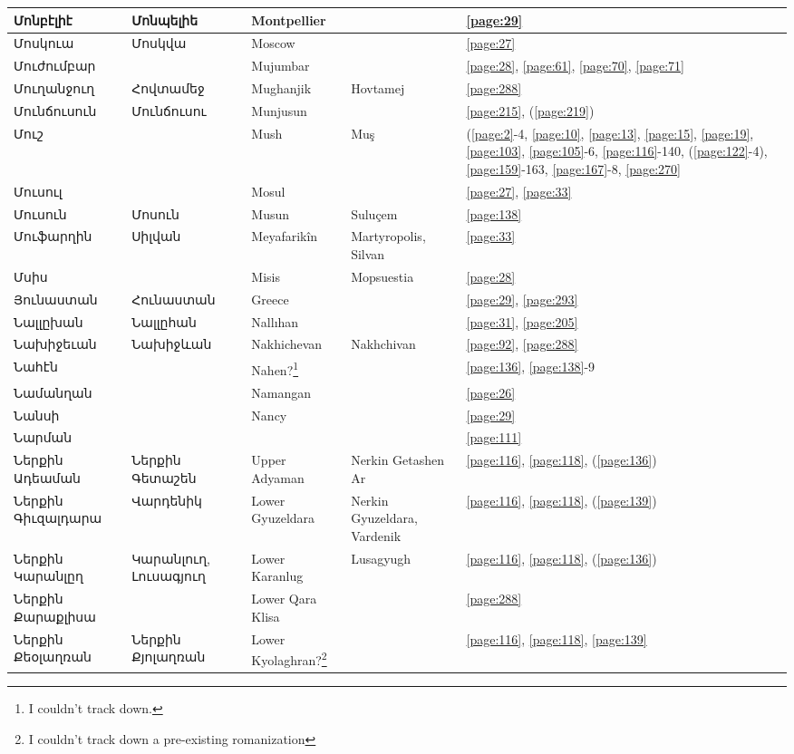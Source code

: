 \begin{center}
\begin{longtable}{|p{}|p{3cm}|p{3cm}|p{2cm}|p{3cm}|}
Մոնբէլիէ&Մոնպելիե & Montpellier& &\ref{page:29}\\ \hline
Մոսկուա& Մոսկվա&Moscow & &\ref{page:27}\\ \hline
Մուժումբար& & Mujumbar& &\ref{page:28}, \ref{page:61}, \ref{page:70}, \ref{page:71}\\ \hline
Մուղանջուղ& Հովտամեջ &  Mughanjik &Hovtamej &\ref{page:288}\\ \hline
Մունճուսուն&Մունճուսու&Munjusun & &\ref{page:215}, (\ref{page:219})\\ \hline
Մուշ& & 
Mush&Muş &(\ref{page:2}-4, \ref{page:10}, \ref{page:13}, \ref{page:15}, \ref{page:19}, \ref{page:103}, \ref{page:105}-6, \ref{page:116}-140, (\ref{page:122}-4), \ref{page:159}-163, \ref{page:167}-8, \ref{page:270}\\ \hline
Մուսուլ& &Mosul & &\ref{page:27}, \ref{page:33}\\ \hline
Մուսուն& Մոսուն & Musun &Suluçem &\ref{page:138}\\ \hline
Մուֆարղին&Սիլվան &Meyafarikîn &Martyropolis, Silvan &\ref{page:33}\\ \hline
Մսիս& & Misis& Mopsuestia&\ref{page:28}\\ \hline
Յունաստան&Հունաստան & Greece& &\ref{page:29}, \ref{page:293}\\ \hline
Նալլըխան& Նալլըհան &Nallıhan & &\ref{page:31}, \ref{page:205}\\ \hline
Նախիջեւան&Նախիջևան &
Nakhichevan& Nakhchivan&\ref{page:92}, \ref{page:288}\\ \hline
Նահէն& &Nahen?\footnote{I couldn't track down.} & &\ref{page:136}, \ref{page:138}-9\\ \hline
Նամանղան& & Namangan& &\ref{page:26}\\ \hline
Նանսի& & Nancy& &\ref{page:29}\\ \hline
Նարման& & & &\ref{page:111}\\ \hline
Ներքին Ադեաման& Ներքին Գետաշեն& Upper Adyaman&  Nerkin Getashen Ar&\ref{page:116}, \ref{page:118}, (\ref{page:136})\\ \hline
Ներքին Գիւզալդարա& Վարդենիկ &Lower Gyuzeldara & Nerkin Gyuzeldara, Vardenik &\ref{page:116}, \ref{page:118}, (\ref{page:139})\\ \hline
Ներքին Կարանլըղ&Կարանլուղ, Լուսագյուղ   & Lower Karanlug &  Lusagyugh &\ref{page:116}, \ref{page:118}, (\ref{page:136})\\ \hline
Ներքին Քարաքլիսա& &Lower Qara Klisa & &\ref{page:288}\\ \hline
Ներքին Քեօլաղռան&Ներքին Քյոլաղռան & Lower Kyolaghran?\footnote{I couldn't track down a pre-existing romanization} &&\ref{page:116}, \ref{page:118}, \ref{page:139}\\ \hline

\end{longtable}
\end{center}
